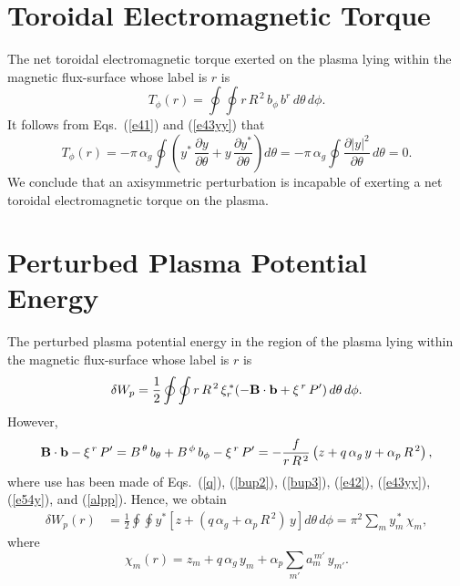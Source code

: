 \documentclass[12pt,prb,aps,notitlepage]{revtex4-1}
\begin{document}
\section{Toroidal Electromagnetic Torque}
The net toroidal electromagnetic torque exerted on the plasma lying within the magnetic flux-surface whose label is $r$ is
\begin{equation}
T_\phi(r)= \oint\oint r\,R^{\,2}\,b_\phi\,b^r\,d\theta\,d\phi.
\end{equation}
It follows from Eqs.~(\ref{e41}) and (\ref{e43yy}) that 
\begin{equation}
T_\phi(r) = -\pi\,\alpha_g\oint\left(y^\ast\,\frac{\partial y}{\partial\theta}+y\,\frac{\partial y^\ast}{\partial\theta}\right)d\theta
= -\pi\,\alpha_g\oint\frac{\partial|y|^2}{\partial\theta}\,d\theta = 0.
\end{equation}
We conclude that an axisymmetric perturbation is incapable of exerting a net toroidal electromagnetic torque on the plasma. 

\section{Perturbed Plasma Potential Energy}
The perturbed plasma potential energy in the region of the plasma lying within the magnetic flux-surface whose label is $r$ is 
\begin{equation}
\delta W_p = \frac{1}{2}\oint\oint r\,R^{\,2}\,\xi_r^{\,\ast}(-{\bf B}\cdot{\bf b} + \xi^{\,r}\,P')\,d\theta\,d\phi.
\end{equation}
However,
\begin{equation}
{\bf B}\cdot{\bf b} -\xi^{\,r}\,P' = B^{\,\theta}\,b_\theta+B^{\,\phi}\,b_\phi - \xi^{\,r}\,P'
= - \frac{f}{r\,R^{\,2}}\left(z + q\,\alpha_g\,y + \alpha_p\,R^{\,2}\right),
\end{equation}
where use has been made of Eqs.~(\ref{q}), (\ref{bup2}), (\ref{bup3}), (\ref{e42}), (\ref{e43yy}), (\ref{e54y}),  and (\ref{alpp}). Hence,
we obtain
\begin{align}
\delta W_p(r) &=\frac{1}{2}\oint\oint y^{\ast}\left[z + (q\,\alpha_g + \alpha_p\,R^{\,2})\,y\right]d\theta\,d\phi= \pi^2\sum_{m}y_m^{\,\ast}\,\chi_m,
\end{align}
where 
\begin{equation}
\chi_m(r)=z_m + q\,\alpha_g\,y_m + \alpha_p\sum_{m'} a_m^{\,m'}\,y_{m'}.
\end{equation}
\end{document}
